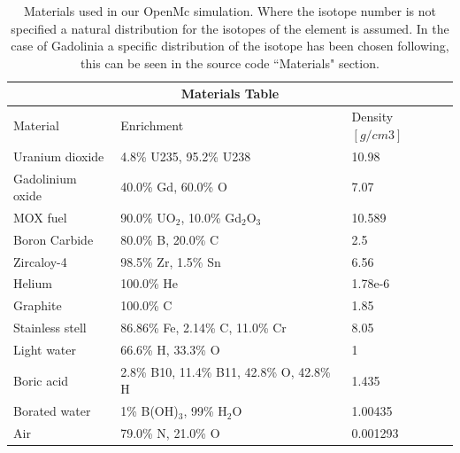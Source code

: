 \documentclass[twocolumn,a4paper,10pt]{article}
\begin{document}
\begin{table}[t]
\centering
\begin{tabular}{|m{2.7cm}<{\raggedright}||m{2cm}<{\raggedright}|m{1.3cm}<{\raggedright}|}
  \hline
  \multicolumn{3}{|c|}{Materials Table} \\
  \hline
  \hline
  Material              &     Enrichment                                  & Density $[g/cm3]$   \\
  \hline
  \hline
  Uranium dioxide       &     4.8\% U235, 95.2\% U238                     & 10.98               \\
  \hline
  Gadolinium oxide      &     40.0\% Gd, 60.0\% O                         &  7.07               \\
  \hline
  MOX fuel              &     90.0\% UO$_2$, 10.0\% Gd$_2$O$_3$           &  10.589             \\
  \hline
  Boron Carbide         &     80.0\% B, 20.0\% C                          &  2.5                \\
  \hline
  Zircaloy-4            &     98.5\% Zr, 1.5\% Sn                         & 6.56                \\
  \hline
  Helium                &     100.0\% He                                  & 1.78e-6             \\
  \hline
  Graphite              &     100.0\% C                                   & 1.85                \\
  \hline
  Stainless stell       &     86.86\% Fe, 2.14\% C, 11.0\% Cr             &  8.05               \\
  \hline
  Light water           &     66.6\% H, 33.3\% O                          &  1                  \\
  \hline
  Boric acid            &     2.8\% B10, 11.4\% B11, 42.8\% O, 42.8\% H   & 1.435               \\
  \hline
  Borated water         &     1\% B(OH)$_3$, 99\% H$_2$O                  & 1.00435             \\
  \hline
  Air                   &     79.0\% N, 21.0\% O                          &  0.001293           \\
  \hline
\end{tabular}
\caption{Materials used in our OpenMc simulation. Where the isotope number is not specified a natural distribution for the isotopes of the element is assumed. In the case of Gadolinia a specific distribution of the isotope has been chosen following\cite{BurnupFuel}, this can be seen in the source code ``Materials" section.}
\label{table:materials}
\end{table}
\end{document}
